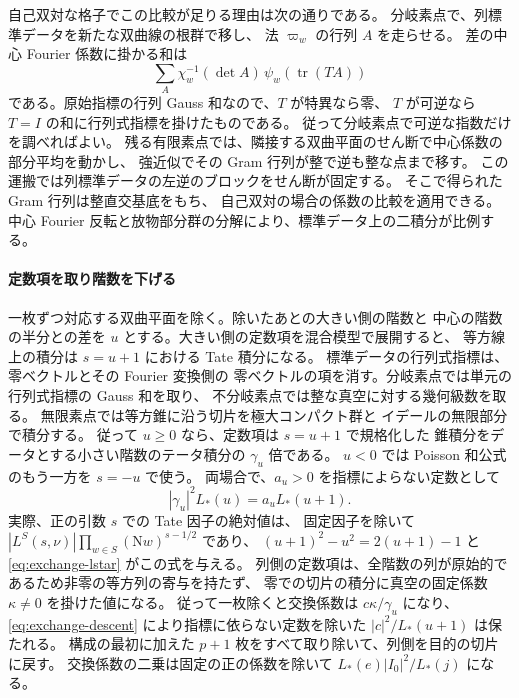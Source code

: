 自己双対な格子でこの比較が足りる理由は次の通りである。
分岐素点で、列標準データを新たな双曲線の根群で移し、
法 \(\varpi_w\) の行列 \(A\) を走らせる。
差の中心 Fourier 係数に掛かる和は
\[
 \sum_{A}\chi_w^{-1}(\det A)\,
       \psi_w(\operatorname{tr}(TA))
\]
である。原始指標の行列 Gauss 和なので、\(T\) が特異なら零、
\(T\) が可逆なら \(T=I\) の和に行列式指標を掛けたものである。
従って分岐素点で可逆な指数だけを調べればよい。
残る有限素点では、隣接する双曲平面のせん断で中心係数の部分平均を動かし、
強近似でその Gram 行列が整で逆も整な点まで移す。
この運搬では列標準データの左逆のブロックをせん断が固定する。
そこで得られた Gram 行列は整直交基底をもち、
自己双対の場合の係数の比較を適用できる。
中心 Fourier 反転と放物部分群の分解により、標準データ上の二積分が比例する。

\paragraph{定数項を取り階数を下げる}
一枚ずつ対応する双曲平面を除く。除いたあとの大きい側の階数と
中心の階数の半分との差を \(u\) とする。大きい側の定数項を混合模型で展開すると、
等方線上の積分は \(s=u+1\) における Tate 積分になる。
標準データの行列式指標は、零ベクトルとその Fourier 変換側の
零ベクトルの項を消す。分岐素点では単元の行列式指標の Gauss 和を取り、
不分岐素点では整な真空に対する幾何級数を取る。
無限素点では等方錐に沿う切片を極大コンパクト群と
イデールの無限部分で積分する。
従って \(u\ge0\) なら、定数項は \(s=u+1\) で規格化した
錐積分をデータとする小さい階数のテータ積分の \(\gamma_u\) 倍である。
\(u<0\) では Poisson 和公式のもう一方を \(s=-u\) で使う。
両場合で、\(a_u>0\) を指標によらない定数として
\begin{equation}\label{eq:exchange-descent}
 |\gamma_u|^2 L_*(u)=a_u L_*(u+1).
\end{equation}
実際、正の引数 \(s\) での Tate 因子の絶対値は、
固定因子を除いて \(|L^S(s,\nu)|\prod_{w\in S}(\mathrm Nw)^{s-1/2}\) であり、
\((u+1)^2-u^2=2(u+1)-1\) と \eqref{eq:exchange-lstar} がこの式を与える。
列側の定数項は、全階数の列が原始的であるため非零の等方列の寄与を持たず、
零での切片の積分に真空の固定係数 \(\kappa\ne0\) を掛けた値になる。
従って一枚除くと交換係数は \(c\kappa/\gamma_u\) になり、
\eqref{eq:exchange-descent} により指標に依らない定数を除いた
\(|c|^2/L_*(u+1)\) は保たれる。
構成の最初に加えた \(p+1\) 枚をすべて取り除いて、列側を目的の切片に戻す。
交換係数の二乗は固定の正の係数を除いて
\(L_*(e)|I_0|^2/L_*(j)\) になる。

